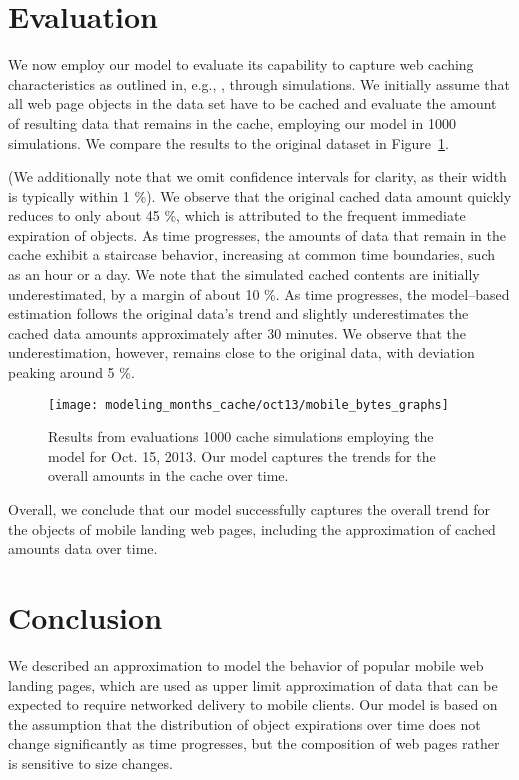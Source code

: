 \documentclass[letterpaper,conference]{IEEEtran}
\begin{document}
\section{Evaluation}
\label{s:eval}
We now employ our model to evaluate its capability to capture web caching characteristics as outlined in, e.g., \cite{JoSe14GreenComm}, through simulations.
We initially assume that all web page objects in the data set have to be cached and evaluate the amount of resulting data that remains in the cache, employing our model in 1000 simulations. 
We compare the results to the original dataset in Figure~\ref{fig:simoct13}.  

(We additionally note that we omit confidence intervals for clarity, as their width is typically within 1 \%).
We observe that the original cached data amount quickly reduces to only about 45 \%, which is attributed to the frequent immediate expiration of objects.
As time progresses, the amounts of data that remain in the cache exhibit a staircase behavior, increasing at common time boundaries, such as an hour or a day.
We note that the simulated cached contents are initially underestimated, by a margin of about 10 \%. 
As time progresses, the model--based estimation follows the original data's trend and slightly underestimates the cached data amounts approximately after 30 minutes.
We observe that the underestimation, however, remains close to the original data, with deviation peaking around 5 \%.

\begin{figure}
	\centering
	\texttt{[image: modeling\_months\_cache/oct13/mobile\_bytes\_graphs]}
	\caption{Results from evaluations 1000 cache simulations employing the model for Oct. 15, 2013. Our model captures the trends for the overall amounts in the cache over time.\label{fig:simoct13}}
\end{figure}

Overall, we conclude that our model successfully captures the overall trend for the objects of mobile landing web pages, including the approximation of cached amounts data over time. 




\section{Conclusion}
\label{s:conc}
We described an approximation to model the behavior of popular mobile web landing pages, which are used as upper limit approximation of data that can be expected to require networked delivery to mobile clients.
Our model is based on the assumption that the distribution of object expirations over time does not change significantly as time progresses, but the composition of web pages rather is sensitive to size changes.
\end{document}
